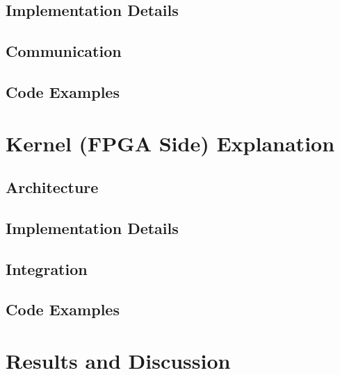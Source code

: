 \documentclass[12pt,oneside,a4paper]{article}
\begin{document}
\subsection{Implementation Details}

\subsection{Communication}

\subsection{Code Examples}



\section{Kernel (FPGA Side) Explanation} 

\subsection{Architecture}

\subsection{Implementation Details}

\subsection{Integration}

\subsection{Code Examples}


\section{Results and Discussion} 
\end{document}
